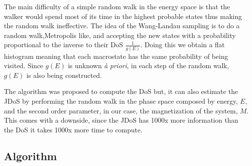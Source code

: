 The main difficulty of a simple random walk in the energy space is that the walker would spend most of its time in the highest probable states thus making the random walk ineffective. The idea of the Wang-Landau sampling is to do a random walk,Metropolis like, and accepting the new states with a probability proportional to the inverse to their DoS $\frac{1}{g(E)}$. Doing this we obtain a flat histogram meaning that each macrostate has the same probability of being visited.  
Since $g(E)$ is unknown \textit{à priori}, in each step of the random walk, $g(E)$ is also being constructed.

The algorithm was proposed to compute the DoS but, it can also estimate the JDoS by performing the random walk in the phase space composed by energy, $E$, and the second order parameter, in our case, the magnetization of the system, $M$. This comes with a downside, since the JDoS has 1000x more information than the DoS it takes 1000x more time to compute.

\subsection{Algorithm}

